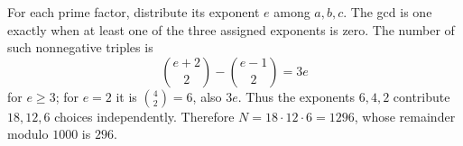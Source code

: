For each prime factor, distribute its exponent $e$ among $a,b,c$. The gcd is one exactly when at least one of the three assigned exponents is zero. The number of such nonnegative triples is
\[
\binom{e+2}{2}-\binom{e-1}{2}=3e
\]
for $e\ge3$; for $e=2$ it is $\binom42=6$, also $3e$. Thus the exponents $6,4,2$ contribute $18,12,6$ choices independently. Therefore $N=18\cdot12\cdot6=1296$, whose remainder modulo $1000$ is $\boxed{296}$.
